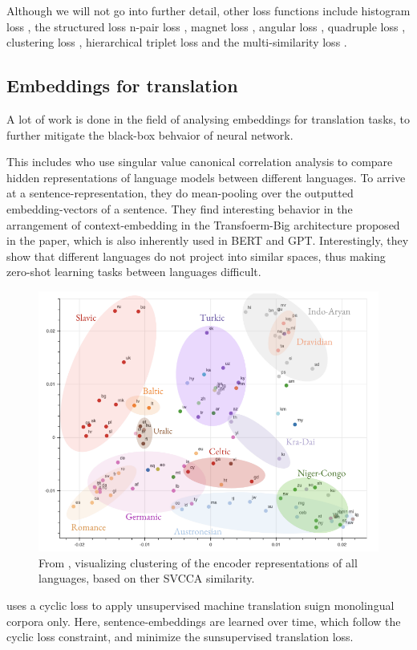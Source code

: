 \documentclass[a4paper,12pt,oneside,openright]{report}
\begin{document}
Although we will not go into further detail, other loss functions include histogram loss \cite{ustinova16}, the structured loss \cite{song16} n-pair loss \cite{sohn16}, magnet loss \cite{rippel16}, angular loss \cite{wang17}, quadruple loss \cite{ni17}, clustering loss \cite{song17}, hierarchical triplet loss \cite{ge18} and the multi-similarity loss \cite{wang19c}.

\subsection{Embeddings for translation}

A lot of work is done in the field of analysing embeddings for translation tasks, to further mitigate the black-box behvaior of neural network.

This includes \cite{kudugunta18} who use singular value canonical correlation analysis to compare hidden representations of language models between different languages.
To arrive at a sentence-representation, they do mean-pooling over the outputted embedding-vectors of a sentence. 
They find interesting behavior in the arrangement of context-embedding in the Transfoerm-Big architecture proposed in the \cite{vaswani17} paper, which is also inherently used in BERT and GPT.
Interestingly, they show that different languages do not project into similar spaces, thus making zero-shot learning tasks between languages difficult.


\begin{figure}[h]
	\center
  \includegraphics[width=0.6\linewidth]{./assets/relatedwork/embeddings_by_language.png}
  \caption{From \cite{kudugunta18}, visualizing clustering of the encoder representations of all languages, based on ther SVCCA similarity.}
  \label{fig:embeddings_by_language}
\end{figure}


\cite{lample18} uses a cyclic loss to apply unsupervised machine translation suign monolingual corpora only. 
Here, sentence-embeddings are learned over time, which follow the cyclic loss constraint, and minimize the sunsupervised translation loss.
\end{document}
